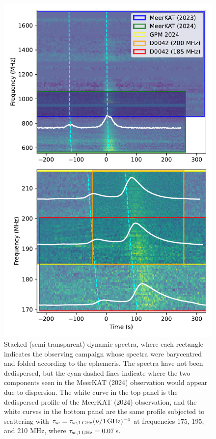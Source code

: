 \documentclass[preprint2,linenumbers]{aastex631}
\begin{document}
\begin{figure}[th]
      \centering
          \includegraphics[width=0.95\linewidth]{stacked_spectra.pdf}
              \caption{Stacked (semi-transparent) dynamic spectra, where each rectangle indicates the observing campaign whose spectra were barycentred and folded according to the ephemeris. The spectra have not been dedispersed, but the cyan dashed lines indicate where the two components seen in the MeerKAT (2024) observation would appear due to dispersion. The white curve in the top panel is the dedispersed profile of the MeerKAT (2024) observation, and the white curves in the bottom panel are the same profile subjected to scattering with $\tau_{\rm sc} = \tau_{\rm sc,1\,GHz} (\nu/{\rm 1\,GHz})^{-4}$ at frequencies 175, 195, and 210 MHz, where $\tau_{\rm sc,1\,GHz} = 0.07\,$s.}
                  \label{fig:stacked_spectra}
\end{figure}
\end{document}
